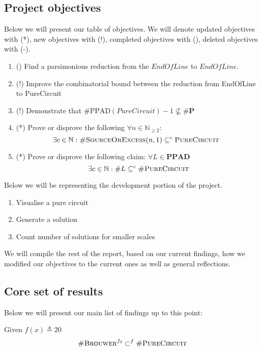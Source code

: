 \subsection{Project objectives}

Below we will present our table of objectives. We will denote updated objectives with
(*), new objectives with (!), completed objectives with (\checkmark),  deleted objectives with (-).

\begin{enumerate}[label*=R.\arabic*)]
    \item (\checkmark) Find a parsimonious reduction from the $\textit{EndOfLine}$ to $\textit{EndOfLine}$.
    \item (!) Improve the combinatorial bound between the reduction from EndOfLine to PureCircuit
    \item (!) Demonstrate that $\textbf{\#}\text{PPAD}(PureCircuit)- 1 \not\subseteq \textbf{\#P}$
    \item (*) Prove or disprove the following $\forall n \in \mathbb{N}_{\geq 2}$:
\[
\!\!\!\! \exists c \in \mathbb{N}:  \textnormal{\textsc{\#SourceOrExcess}}(n, 1) \subseteq^c \textnormal{\textsc{PureCircuit}}
\]
\item (*) Prove or disprove the following claim: $\forall L \in \textbf{PPAD}$
    $$
    \exists c \in \mathbb{N}: \#L \subseteq^c \textnormal{\textsc{\#PureCircuit}}
    $$
\end{enumerate}

Below we will be representing the development portion of the project.

\begin{enumerate}[label=S.\arabic*)]
    \item Visualise a pure circuit
    \item Generate a solution
    \item Count number of solutions for smaller scales 
\end{enumerate}


We will compile the rest of the report, based on our current findings, how we modified our objectives to
the current ones as well as general reflections.


\subsection{Core set of results}

Below we will present our main list of findings up to this point:

\begin{theorem}
    Given $f(x) \triangleq 20$
    $$
    \textnormal{\textsc{\#Brouwer}}^{f_3} \subset^f \textnormal{\textsc{\#PureCircuit}}
    $$
\end{theorem}

